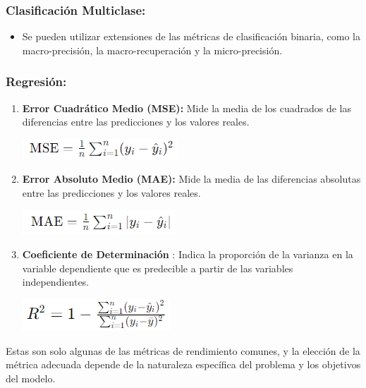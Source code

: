 \documentclass[
]{article}
\providecommand{\tightlist}{%
  \setlength{\itemsep}{0pt}\setlength{\parskip}{0pt}}
\begin{document}
\hypertarget{clasificaciuxf3n-multiclase}{%
\subsubsection{\texorpdfstring{\textbf{Clasificación
Multiclase:}}{Clasificación Multiclase:}}\label{clasificaciuxf3n-multiclase}}

\begin{itemize}
\tightlist
\item
  Se pueden utilizar extensiones de las métricas de clasificación
  binaria, como la macro-precisión, la macro-recuperación y la
  micro-precisión.
\end{itemize}

\hypertarget{regresiuxf3n}{%
\subsubsection{\texorpdfstring{\textbf{Regresión:}}{Regresión:}}\label{regresiuxf3n}}

\begin{enumerate}
\def\labelenumi{\arabic{enumi}.}
\item
  \textbf{Error Cuadrático Medio (MSE):} Mide la media de los cuadrados
  de las diferencias entre las predicciones y los valores reales.

  \includegraphics{images/Error cuadratico.png}
\item
  \textbf{Error Absoluto Medio (MAE):} Mide la media de las diferencias
  absolutas entre las predicciones y los valores reales.

  \includegraphics{images/Error absoluto.png}
\item
  \textbf{Coeficiente de Determinación} : Indica la proporción de la
  varianza en la variable dependiente que es predecible a partir de las
  variables independientes.

  \includegraphics{images/Coeficiente de determinacion.png}
\end{enumerate}

Estas son solo algunas de las métricas de rendimiento comunes, y la
elección de la métrica adecuada depende de la naturaleza específica del
problema y los objetivos del modelo.
\end{document}
